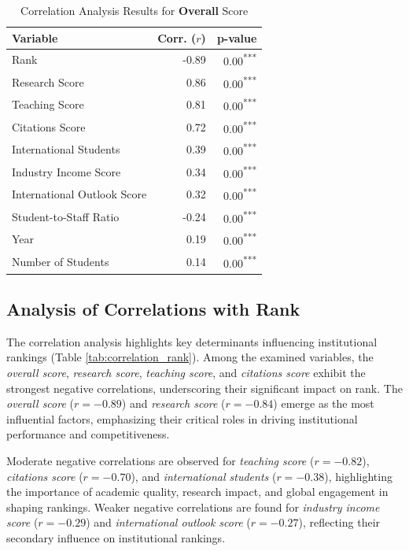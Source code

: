 \documentclass[conference]{IEEEtran}
\begin{document}
\begin{table}[h!]
	\centering
	\caption{Correlation Analysis Results for \textbf{Overall} Score}
	\label{tab:correlation_overall}
	\begin{tabular}{|l|r|r|}
		\hline
		\textbf{Variable} & \textbf{Corr. ($r$)} & \textbf{p-value} \\
		\hline
		Rank & -0.89 & 0.00\textsuperscript{***} \\
		Research Score & 0.86 & 0.00\textsuperscript{***} \\
		Teaching Score & 0.81 & 0.00\textsuperscript{***} \\
		Citations Score & 0.72 & 0.00\textsuperscript{***} \\
		International Students & 0.39 & 0.00\textsuperscript{***} \\
		Industry Income Score & 0.34 & 0.00\textsuperscript{***} \\
		International Outlook Score & 0.32 & 0.00\textsuperscript{***} \\
		Student-to-Staff Ratio & -0.24 & 0.00\textsuperscript{***} \\
		Year & 0.19 & 0.00\textsuperscript{***} \\
		Number of Students & 0.14 & 0.00\textsuperscript{***} \\
		\hline
	\end{tabular}
\end{table}



\subsection{Analysis of Correlations with Rank}

The correlation analysis highlights key determinants influencing institutional rankings (Table \ref{tab:correlation_rank}). Among the examined variables, the \textit{overall score}, \textit{research score}, \textit{teaching score}, and \textit{citations score} exhibit the strongest negative correlations, underscoring their significant impact on rank. The \textit{overall score} ($r = -0.89$) and \textit{research score} ($r = -0.84$) emerge as the most influential factors, emphasizing their critical roles in driving institutional performance and competitiveness.

Moderate negative correlations are observed for \textit{teaching score} ($r = -0.82$), \textit{citations score} ($r = -0.70$), and \textit{international students} ($r = -0.38$), highlighting the importance of academic quality, research impact, and global engagement in shaping rankings. Weaker negative correlations are found for \textit{industry income score} ($r = -0.29$) and \textit{international outlook score} ($r = -0.27$), reflecting their secondary influence on institutional rankings.
\end{document}
